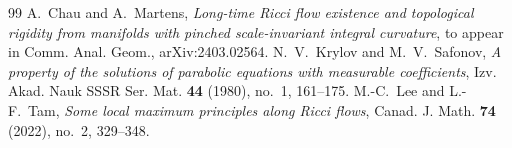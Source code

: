\documentclass[10pt,a4paper]{amsart}
\begin{document}
\begin{thebibliography}{99}
 A.~Chau and A.~Martens, \textit{Long-time Ricci flow existence and topological rigidity from manifolds with pinched scale-invariant integral curvature}, to appear in Comm. Anal. Geom., arXiv:2403.02564.
 N.~V.~Krylov and M.~V.~Safonov, \textit{A property of the solutions of parabolic equations with measurable coefficients}, Izv. Akad. Nauk SSSR Ser. Mat. \textbf{44} (1980), no.~1, 161--175.
 M.-C.~Lee and L.-F.~Tam, \textit{Some local maximum principles along Ricci flows}, Canad. J. Math. \textbf{74} (2022), no.~2, 329--348.
\end{thebibliography}
\end{document}
